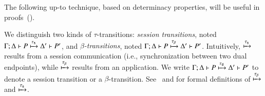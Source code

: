 \documentclass[preprint,11pt]{elsarticle}
\newtheorem{definition}{Definition}[section]
\begin{document}
{{%
%


The following up-to technique, based on determinacy properties, will be useful in proofs~().

 
 \begin{notation}
 \label{not:dettrans}
We distinguish two kinds of  $\tau$-transitions:
\emph{session transitions}, noted 
$\Gamma; \Delta \vdash P \xmapsto{\tau_{\mathsf{s}}} \Delta' \vdash P'$,
and 
\emph{$\beta$-transitions}, noted $\Gamma; \Delta \vdash P \xmapsto{\tau_{\beta}} \Delta' \vdash P'$.
Intuitively, $\xmapsto{\tau_{\mathsf{s}}}$  results from a session communication (i.e., synchronization between
two dual endpoints), while 
  $\xmapsto{\tau_{\beta}}$ results from an application. 
 We write  $\Gamma; \Delta \vdash P \xmapsto{\tau_{\mathsf{d}}} \Delta' \vdash P'$ to denote
	 a session transition or a $\beta$-transition.
	See~ and \cite{KouzapasPY17} for formal definitions of $\xmapsto{\tau_{\beta}}$  and $\xmapsto{\tau_{\mathsf{s}}}$. %
 \end{notation}
 
}}
\end{document}
